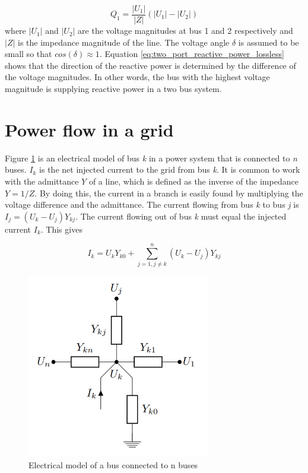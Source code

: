 \documentclass[class=book, crop=false]{standalone}
\begin{document}
\begin{equation}\label{eq:two_port_reactive_power_lossless}
Q_{1} =  \frac{|U_{1}|}{|Z|}(|U_{1}| - |U_{2}|)
\end{equation}
where $|U_{1}|$ and $|U_{2}|$ are the voltage magnitudes at bus 1 and 2 respectively and $|Z|$ is the impedance magnitude of the line. The voltage angle $\delta$ is assumed to be small so that $cos(\delta) \approx 1$. Equation \eqref{eq:two_port_reactive_power_lossless} shows that the direction of the reactive power is determined by the difference of the voltage magnitudes. In other words, the bus with the highest voltage magnitude is supplying reactive power in a two bus system.

\section{Power flow in a grid}
Figure \ref{fig:power_flow_network} is an electrical model of bus \textit{k} in a power system that is connected to \textit{n} buses. $I_{k}$ is the net injected current to the grid from bus \textit{k}\cite{opf_intro}. It is common to work with the admittance $Y$ of a line, which is defined as the inverse of the impedance $Y = 1/Z$. By doing this, the current in a branch is easily found by multiplying the voltage difference and the admittance. The current flowing from bus \textit{k} to bus \textit{j} is $I_{j} = (U_{k} - U_{j})Y_{kj}$. The current flowing out of bus \textit{k} must equal the injected current $I_{k}$. This gives

\begin{equation}\label{eq:powerflow_currentsum}
I_{k} =  U_{k}Y_{k0}
+ \sum_{j=1,j\neq k}^{n}(U_{k} - U_{j})Y_{kj}
\end{equation}


\begin{figure}[ht]
    \center
    \includegraphics[width=8cm]{figures/power_flow_network.PNG}
    \caption[size = 9]{Electrical model of a bus connected to n buses}
	\label{fig:power_flow_network}
\end{figure}
\end{document}
